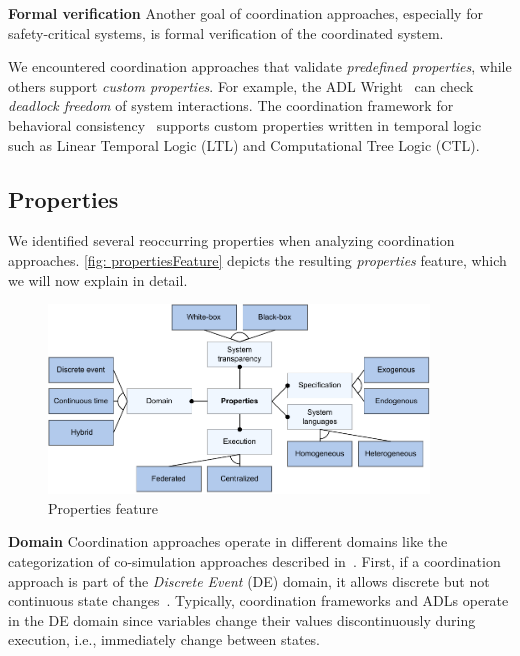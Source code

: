 \documentclass[runningheads]{llncs}
\newcommand{\feature}[1]{\textbf{#1}}
\begin{document}
\feature{Formal verification} Another goal of coordination approaches, especially for safety-critical systems, is formal verification of the coordinated system.

We encountered coordination approaches that validate \textit{predefined properties}, while others support \textit{custom properties}.
For example, the ADL Wright~\cite{allenFormalBasisArchitectural1997} can check \textit{deadlock freedom} of system interactions.
The coordination framework for behavioral consistency~\cite{krauterBehavioralConsistencyMultimodeling2023} supports custom properties written in temporal logic such as Linear Temporal Logic (LTL) and Computational Tree Logic (CTL).

\subsection{Properties}
We identified several reoccurring properties when analyzing coordination approaches.
\autoref{fig: propertiesFeature} depicts the resulting \textit{properties} feature, which we will now explain in detail.

\begin{figure}[ht]
	\centering
	\includegraphics[width=0.9\textwidth]{images/properties_feature}
	\caption{Properties feature}
	\label{fig: propertiesFeature}
\end{figure}

\feature{Domain} Coordination approaches operate in different domains like the categorization of co-simulation approaches described in~\cite{gomesCoSimulationSurvey2019,liboniComplexSystemsCosimulation2021}.
First, if a coordination approach is part of the \textit{Discrete Event} (DE) domain, it allows discrete but not continuous state changes~\cite{gomesCoSimulationSurvey2019}.
Typically, coordination frameworks and ADLs operate in the DE domain since variables change their values discontinuously during execution, i.e., immediately change between states.
\end{document}
